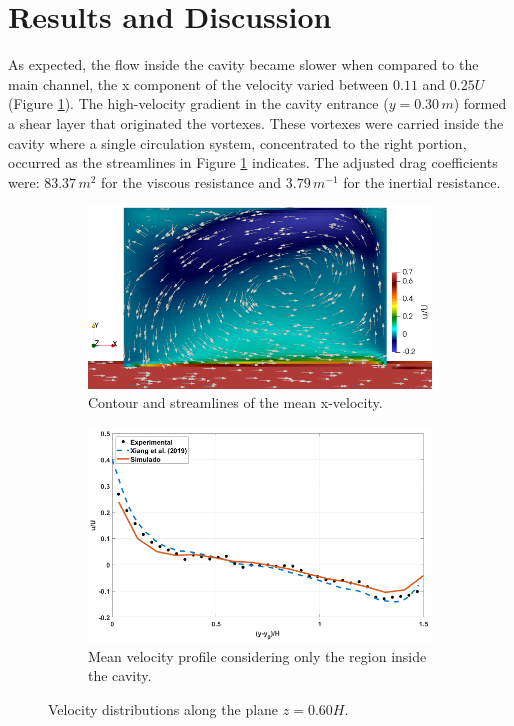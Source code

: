 \section{Results and Discussion}
As expected, the flow inside the cavity became slower when compared to the main channel, the x component of the velocity varied between $0.11$ and $0.25U$ (Figure \ref{fig:art2:velCont}). The high-velocity gradient in the cavity entrance ($y=0.30\,m$) formed a shear layer that originated the vortexes. These vortexes were carried inside the cavity where a single circulation system, concentrated to the right portion, occurred as the streamlines in Figure \ref{fig:art2:velCont} indicates. The adjusted drag coefficients were: $83.37\,m^2$ for the viscous resistance and $3.79\,m^{-1}$ for the inertial resistance.

\begin{figure}[!ht]
\centering
\begin{subfigure}{0.49\textwidth}
  \centering
  \includegraphics[width=0.9\linewidth]{../images/art2/imgHyd2.png}
  \caption[width=0.9\linewidth]{Contour and streamlines of the mean x-velocity.}
  \label{fig:art2:velCont}
\end{subfigure}%
\begin{subfigure}{.49\textwidth}
  \centering
  \includegraphics[width=0.9\linewidth]{../images/art2/imgHyd3.png}
  \caption[width=0.9\linewidth]{Mean velocity profile considering only the region inside the cavity.}
  \label{fig:art2:velProf}
\end{subfigure}
\caption{Velocity distributions along the plane $z=0.60H$.}
\label{fig:art2:velz06H}
\end{figure}
